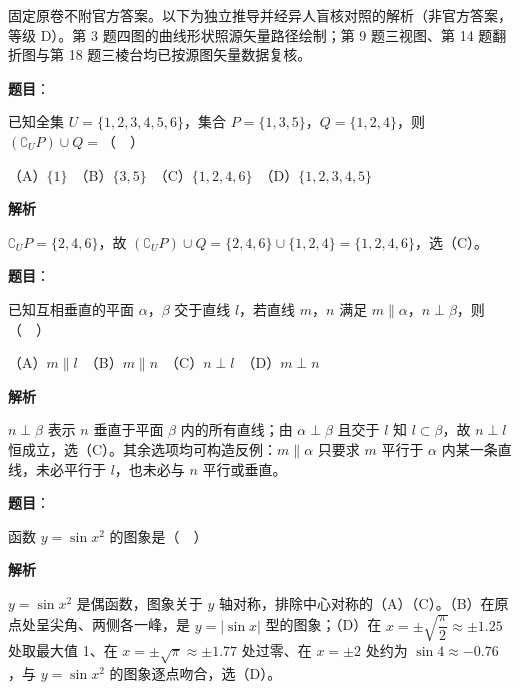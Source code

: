 

\begin{gktip}
固定原卷不附官方答案。以下为独立推导并经异人盲核对照的解析（非官方答案，等级 D）。第 3 题四图的曲线形状照源矢量路径绘制；第 9 题三视图、第 14 题翻折图与第 18 题三棱台均已按源图矢量数据复核。
\end{gktip}

\begin{answer}

\textbf{题目}：

已知全集 \(U=\{1,2,3,4,5,6\}\)，集合 \(P=\{1,3,5\}\)，\(Q=\{1,2,4\}\)，则 \((\complement_U P)\cup Q=\)（　）

（A）\(\{1\}\)　（B）\(\{3,5\}\)　（C）\(\{1,2,4,6\}\)　（D）\(\{1,2,3,4,5\}\)

\textbf{解析}

\(\complement_U P=\{2,4,6\}\)，故 \((\complement_U P)\cup Q=\{2,4,6\}\cup\{1,2,4\}=\{1,2,4,6\}\)，选（C）。


\end{answer}
\begin{answer}

\textbf{题目}：

已知互相垂直的平面 \(\alpha\)，\(\beta\) 交于直线 \(l\)，若直线 \(m\)，\(n\) 满足 \(m\parallel\alpha\)，\(n\perp\beta\)，则（　）

（A）\(m\parallel l\)　（B）\(m\parallel n\)　（C）\(n\perp l\)　（D）\(m\perp n\)

\textbf{解析}

\(n\perp\beta\) 表示 \(n\) 垂直于平面 \(\beta\) 内的所有直线；由 \(\alpha\perp\beta\) 且交于 \(l\) 知 \(l\subset\beta\)，故 \(n\perp l\) 恒成立，选（C）。其余选项均可构造反例：\(m\parallel\alpha\) 只要求 \(m\) 平行于 \(\alpha\) 内某一条直线，未必平行于 \(l\)，也未必与 \(n\) 平行或垂直。


\end{answer}
\begin{answer}

\textbf{题目}：

函数 \(y=\sin x^{2}\) 的图象是（　）
\nopagebreak[4]
\begin{center}\end{center}
\nopagebreak[4]
\textbf{解析}

\(y=\sin x^{2}\) 是偶函数，图象关于 \(y\) 轴对称，排除中心对称的（A）（C）。（B）在原点处呈尖角、两侧各一峰，是 \(y=|\sin x|\) 型的图象；（D）在 \(x=\pm\sqrt{\dfrac{\pi}{2}}\approx\pm1.25\) 处取最大值 1、在 \(x=\pm\sqrt{\pi}\approx\pm1.77\) 处过零、在 \(x=\pm2\) 处约为 \(\sin 4\approx-0.76\)，与 \(y=\sin x^{2}\) 的图象逐点吻合，选（D）。


\end{answer}
